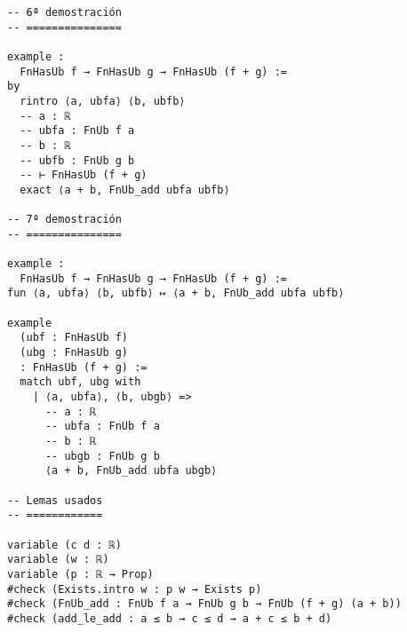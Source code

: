 \begin{verbatim}
-- 6ª demostración
-- ===============

example :
  FnHasUb f → FnHasUb g → FnHasUb (f + g) :=
by
  rintro ⟨a, ubfa⟩ ⟨b, ubfb⟩
  -- a : ℝ
  -- ubfa : FnUb f a
  -- b : ℝ
  -- ubfb : FnUb g b
  -- ⊢ FnHasUb (f + g)
  exact ⟨a + b, FnUb_add ubfa ubfb⟩

-- 7ª demostración
-- ===============

example :
  FnHasUb f → FnHasUb g → FnHasUb (f + g) :=
fun ⟨a, ubfa⟩ ⟨b, ubfb⟩ ↦ ⟨a + b, FnUb_add ubfa ubfb⟩

example
  (ubf : FnHasUb f)
  (ubg : FnHasUb g)
  : FnHasUb (f + g) :=
  match ubf, ubg with
    | ⟨a, ubfa⟩, ⟨b, ubgb⟩ =>
      -- a : ℝ
      -- ubfa : FnUb f a
      -- b : ℝ
      -- ubgb : FnUb g b
      ⟨a + b, FnUb_add ubfa ubgb⟩

-- Lemas usados
-- ============

variable (c d : ℝ)
variable (w : ℝ)
variable (p : ℝ → Prop)
#check (Exists.intro w : p w → Exists p)
#check (FnUb_add : FnUb f a → FnUb g b → FnUb (f + g) (a + b))
#check (add_le_add : a ≤ b → c ≤ d → a + c ≤ b + d)
\end{verbatim}

